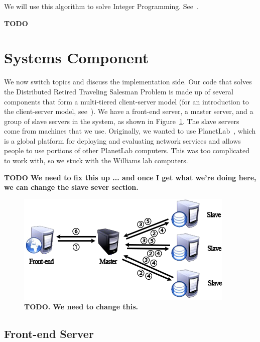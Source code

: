 \documentclass{article}
\begin{document}
We will use this algorithm to solve Integer Programming. See~\cite{doi:10.1287/opre.13.4.517}.

{\bf TODO}




\section{Systems Component}\label{sec:systems}

We now switch topics and discuss the implementation side. Our code that solves the Distributed Retired Traveling Salesman Problem is made up of
several components that form a multi-tiered client-server model (for an introduction to the client-server model,
see~\cite{Tanenbaum:2006:DSP:1202502}).  We have a front-end server, a master server, and a group of slave servers in the system, as shown in
Figure~\ref{fig:machines}. The slave servers come from machines that we use. Originally, we wanted to use PlanetLab~\cite{conf/osdi/PetersonBFM06},
which is a global platform for deploying and evaluating network services and allows people to use portions of other PlanetLab computers. This was too
complicated to work with, so we stuck with the Williams lab computers.

{\bf TODO We need to fix this up ... and once I get what we're doing here, we can change the slave sever section.}

\begin{figure}[t]
\vskip 0.2in
\begin{center}
\centerline{\includegraphics[width=\columnwidth]{servers}}
\caption{{\bf TODO. We need to change this.}}
\label{fig:machines}
\end{center}
\vskip -0.2in
\end{figure}

\subsection{Front-end Server}\label{sec:front_end_server}
\end{document}
